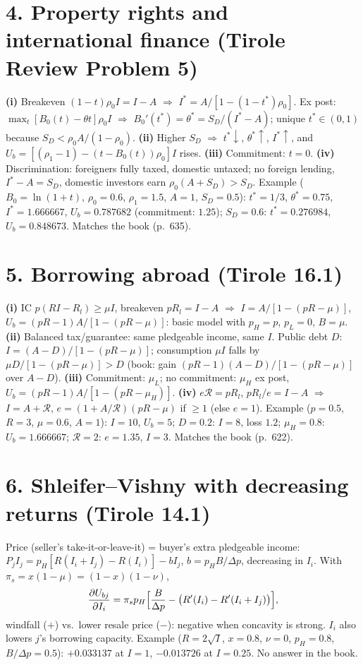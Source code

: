 \documentclass[11pt,a4paper]{article}
\newcommand{\Rc}{\mathcal{R}}
\begin{document}
\section*{4. Property rights and international finance (Tirole Review Problem 5)}
\textbf{(i)} Breakeven $(1-t)\rho_0I=I-A$ $\Rightarrow$ $I^*=A/[1-(1-t^*)\rho_0]$. Ex post: $\max_t[B_0(t)-\theta t]\rho_0I$ $\Rightarrow$ $B_0'(t^*)=\theta^*=S_D/(I^*-A)$; unique $t^*\in(0,1)$ because $S_D<\rho_0A/(1-\rho_0)$.
\textbf{(ii)} Higher $S_D$ $\Rightarrow$ $t^*\downarrow$, $\theta^*\uparrow$, $I^*\uparrow$, and $U_b=[(\rho_1-1)-(t-B_0(t))\rho_0]I$ rises.
\textbf{(iii)} Commitment: $t=0$.
\textbf{(iv)} Discrimination: foreigners fully taxed, domestic untaxed; no foreign lending, $I^*-A=S_D$, domestic investors earn $\rho_0(A+S_D)>S_D$.
Example ($B_0=\ln(1+t)$, $\rho_0=0.6$, $\rho_1=1.5$, $A=1$, $S_D=0.5$): $t^*=1/3$, $\theta^*=0.75$, $I^*=1.666667$, $U_b=0.787682$ (commitment: $1.25$); $S_D=0.6$: $t^*=0.276984$, $U_b=0.848673$. Matches the book (p.~635).

\section*{5. Borrowing abroad (Tirole 16.1)}
\textbf{(i)} IC $p(RI-R_l)\geq\mu I$, breakeven $pR_l=I-A$ $\Rightarrow$ $I=A/[1-(pR-\mu)]$, $U_b=(pR-1)A/[1-(pR-\mu)]$: basic model with $p_H=p$, $p_L=0$, $B=\mu$.
\textbf{(ii)} Balanced tax/guarantee: same pledgeable income, same $I$. Public debt $D$: $I=(A-D)/[1-(pR-\mu)]$; consumption $\mu I$ falls by $\mu D/[1-(pR-\mu)]>D$ (book: gain $(pR-1)(A-D)/[1-(pR-\mu)]$ over $A-D$).
\textbf{(iii)} Commitment: $\mu_L$; no commitment: $\mu_H$ ex post, $U_b=(pR-1)A/[1-(pR-\mu_H)]$.
\textbf{(iv)} $e\Rc=pR_l$, $pR_l/e=I-A$ $\Rightarrow$ $I=A+\Rc$, $e=(1+A/\Rc)(pR-\mu)$ if $\geq1$ (else $e=1$).
Example ($p=0.5$, $R=3$, $\mu=0.6$, $A=1$): $I=10$, $U_b=5$; $D=0.2$: $I=8$, loss $1.2$; $\mu_H=0.8$: $U_b=1.666667$; $\Rc=2$: $e=1.35$, $I=3$. Matches the book (p.~622).

\section*{6. Shleifer--Vishny with decreasing returns (Tirole 14.1)}
Price (seller's take-it-or-leave-it) = buyer's extra pledgeable income: $P_jI_j=p_H[R(I_i+I_j)-R(I_i)]-bI_j$, $b=p_HB/\Delta p$, decreasing in $I_i$. With $\pi_s=x(1-\mu)=(1-x)(1-\nu)$,
$$\frac{\partial U_{bj}}{\partial I_i}=\pi_sp_H\Bigl[\frac{B}{\Delta p}-\bigl(R'(I_i)-R'(I_i+I_j)\bigr)\Bigr],$$
windfall ($+$) vs.\ lower resale price ($-$): negative when concavity is strong. $I_i$ also lowers $j$'s borrowing capacity.
Example ($R=2\sqrt I$, $x=0.8$, $\nu=0$, $p_H=0.8$, $B/\Delta p=0.5$): $+0.033137$ at $I=1$, $-0.013726$ at $I=0.25$. No answer in the book.
\end{document}
